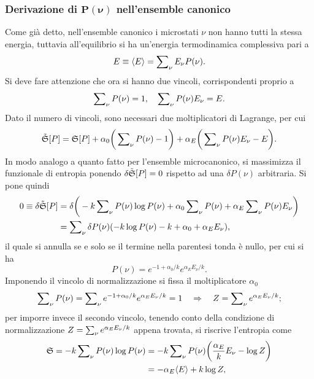 \subsubsection{Derivazione di \texorpdfstring{$\bm{P(\nu)}$}{P(nu)} nell'ensemble canonico}
Come già detto, nell'ensemble canonico i microstati $\nu$ non hanno tutti la stessa energia, tuttavia all'equilibrio si ha un'energia termodinamica complessiva pari a
\begin{equation}
    E \equiv \langle E \rangle = \sum\nolimits_\nu E_\nu P(\nu).
\end{equation}
Si deve fare attenzione che ora si hanno due vincoli, corrispondenti proprio a
\begin{equation}
    \sum\nolimits_\nu P(\nu) = 1,\quad \sum\nolimits_\nu P(\nu)E_\nu = E.
\end{equation}
Dato il numero di vincoli, sono necessari due moltiplicatori di Lagrange, per cui
\begin{equation}
    \tilde{\mathfrak{S}}[P] = \mathfrak{S}[P] + \alpha_0\bigg(\sum\nolimits_\nu P(\nu) - 1\bigg) + \alpha_E\bigg(\sum\nolimits_\nu P(\nu)E_\nu - E\bigg).
\end{equation}
In modo analogo a quanto fatto per l'ensemble microcanonico, si massimizza il funzionale di entropia ponendo $\delta\tilde{\mathfrak{S}}[P] = 0$ rispetto ad una $\delta P(\nu)$ arbitraria. Si pone quindi
\begin{equation}
    \begin{split}
        0 \equiv \delta\tilde{\mathfrak{S}}[P] &= \delta\bigg(-k\sum\nolimits_\nu P(\nu)\log{P(\nu)} + \alpha_0\sum\nolimits_\nu P(\nu) + \alpha_E\sum\nolimits_\nu P(\nu)E_\nu\bigg) \\
        &= \sum\nolimits_\nu \delta P(\nu)(-k\log{P(\nu)} - k + \alpha_0 + \alpha_E E_\nu),
    \end{split}
\end{equation}
il quale si annulla se e solo se il termine nella parentesi tonda è nullo, per cui si ha
\begin{equation}
    P(\nu) = e^{-1 + \alpha_0/k}e^{\alpha_E E_\nu/k}.
\end{equation}
Imponendo il vincolo di normalizzazione si fissa il moltiplicatore $\alpha_0$
\begin{equation}
    \sum\nolimits_\nu P(\nu) = \sum\nolimits_\nu e^{-1 + \alpha_0/k}e^{\alpha_E E_\nu/k} = 1\quad\Rightarrow\quad Z = \sum\nolimits_\nu e^{\alpha_E E_\nu/k};
\end{equation}
per imporre invece il secondo vincolo, tenendo conto della condizione di normalizzazione $Z = \sum\nolimits_\nu e^{\alpha_E E_\nu/k}$ appena trovata, si riscrive l'entropia come
\begin{equation}
    \begin{split}
        \mathfrak{S} = -k\sum\nolimits_\nu P(\nu)\log{P(\nu)} &= -k\sum\nolimits_\nu P(\nu)\bigg(\frac{\alpha_E}{k}E_\nu - \log{Z}\bigg) \\
        &= -\alpha_E\langle E \rangle + k\log{Z},
    \end{split}
\end{equation}
